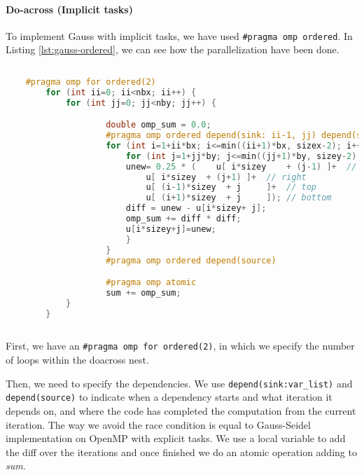 \documentclass[a4paper, 10pt]{article}
\begin{document}
\clearpage
\paragraph{Do-across (Implicit tasks)\\}


To implement Gauss with implicit tasks, we have used \texttt{\#pragma omp ordered}. In Listing \ref{lst:gauss-ordered}, we can see how the parallelization have been done.

\begin{lstlisting}[language=c, caption={OpenMP pragma for Gauss-Seidel parallelization}, label={lst:gauss-ordered}]
    
    #pragma omp for ordered(2)
        for (int ii=0; ii<nbx; ii++) {
            for (int jj=0; jj<nby; jj++) {

                    double omp_sum = 0.0;
                    #pragma omp ordered depend(sink: ii-1, jj) depend(sink: ii, jj-1)
                    for (int i=1+ii*bx; i<=min((ii+1)*bx, sizex-2); i++) {
                        for (int j=1+jj*by; j<=min((jj+1)*by, sizey-2); j++) {
                        unew= 0.25 * (    u[ i*sizey	+ (j-1) ]+  // left
                            u[ i*sizey	+ (j+1) ]+  // right
                            u[ (i-1)*sizey	+ j     ]+  // top
                            u[ (i+1)*sizey	+ j     ]); // bottom
                        diff = unew - u[i*sizey+ j];
                        omp_sum += diff * diff; 
                        u[i*sizey+j]=unew;
                        } 
                    }
                    #pragma omp ordered depend(source)

                    #pragma omp atomic
                    sum += omp_sum;
            }
        }
    
    \end{lstlisting}

First, we have an \texttt{\#pragma omp for ordered(2)}, in which we specify the number of loops within the doacross nest. 

Then, we need to specify the dependencies. We use \texttt{depend(sink:var\_list)} and \texttt{depend(source)} to indicate when a dependency starts and what iteration it depends on, and where the code has completed the computation from the current iteration. The way we avoid the race condition is equal to Gauss-Seidel implementation on OpenMP with explicit tasks. We use a local variable to add the diff over the iterations and once finished we do an atomic operation adding to \textit{sum}.
\end{document}

